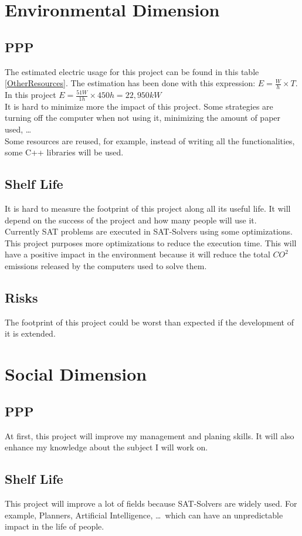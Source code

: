 \section{Environmental Dimension }
\subsection{PPP}
The estimated electric usage for this project can be found in this table \ref{OtherResources}. The estimation has been done with this expression: $E=\frac{W}{h} \times T$. In this project $E=\frac{51W}{1h}\times 450h = 22,950kW$\\

It is hard to minimize more the impact of this project. Some strategies are turning off the computer when not using it, minimizing the amount of paper used, \ldots\\
Some resources are reused, for example, instead of writing all the functionalities, some C++ libraries will be used.
\subsection{Shelf Life}
It is hard to measure the footprint of this project along all its useful life. It will depend on the success of the project and how many people will use it. \\

Currently SAT problems are executed in SAT-Solvers using some optimizations. This project purposes more optimizations to reduce the execution time. This will have a positive impact in the environment because it will reduce the total $CO^2$ emissions released by the computers used to solve them.
\subsection{Risks} 
The footprint of this project could be worst than expected if the development of it is extended.

\section{Social Dimension}
\subsection{PPP}
At first, this project will improve my management and planing skills. It will also enhance my knowledge about the subject I will work on.
\subsection{Shelf Life}
This project will improve a lot of fields because SAT-Solvers are widely used. For example, Planners, Artificial Intelligence, \ldots \ which can have an unpredictable impact in the life of people.\\

